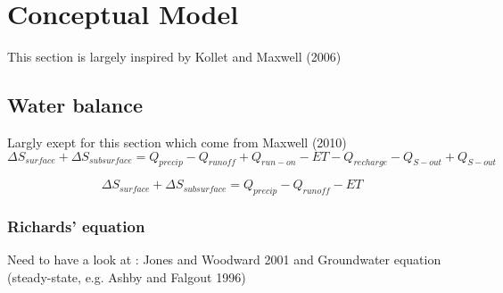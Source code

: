 \documentclass[11pt,a4paper]{report}
\begin{document}
\chapter{Conceptual Model}

This section is largely inspired by Kollet and Maxwell (2006)

\section{Water balance}
Largly exept for this section which come from Maxwell (2010)
\begin{equation}
\Delta S_{surface} + \Delta S_{subsurface} = Q_{precip} - Q_{runoff} + Q_{run-on} -ET -Q_{recharge} - Q_{S-out} + Q_{S-out}
\end{equation}

\begin{equation}
\Delta S_{surface} + \Delta S_{subsurface} = Q_{precip} - Q_{runoff} -ET
\end{equation}

\subsection{Richards' equation}

Need to have a look at : Jones and Woodward 2001 and 
Groundwater equation (steady-state, e.g. Ashby and Falgout 1996)
\end{document}
